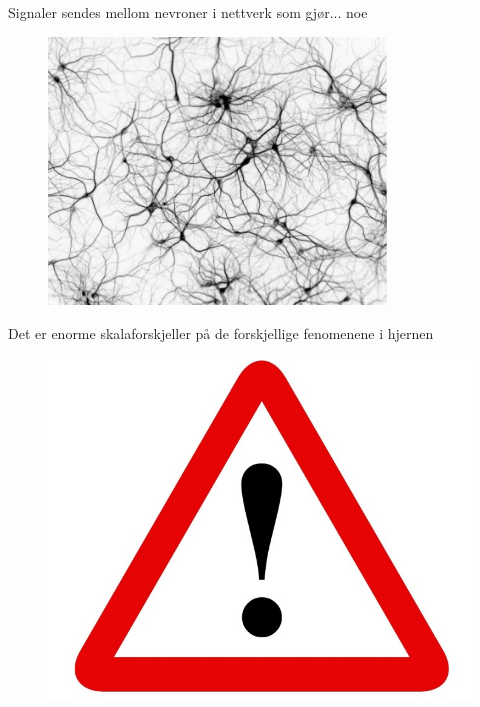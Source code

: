 \documentclass[presentation]{beamer}
\begin{document}
\begin{frame}{Signaler sendes mellom nevroner i nettverk som gjør... noe}
   \begin{figure}
       {\includegraphics[width=0.8\textwidth]{network2.jpg}}
\end{figure}
\end{frame}


\begin{frame}{Det er enorme skalaforskjeller på de forskjellige fenomenene i hjernen}
   \begin{figure}
       {\includegraphics[width=1\textwidth]{alert.jpg}}
\end{figure}
\end{frame}
\end{document}
